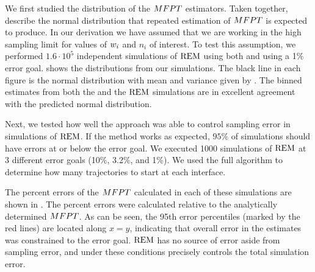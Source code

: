 We first studied the distribution of the $MFPT$ estimators. Taken together,  describe the normal distribution that repeated estimation of $MFPT$ is expected to produce. In our derivation we have assumed that we are working in the high sampling limit for values of $w_{i}$ and $n_i$ of interest. To test this assumption, we performed $1.6 \cdot 10^5$ independent simulations of $\text{REM}$ using both  and  using a 1\% error goal.  shows the distributions from our simulations. The black line in each figure is the normal distribution with mean and variance given by . The binned  estimates from both the  and the  $\text{REM}$ simulations are in excellent agreement with the predicted normal distribution.

Next, we tested how well the  approach was able to control sampling error in simulations of $\text{REM}$. If the method works as expected, $95\%$ of simulations should have errors at or below the  error goal. We executed 1000  simulations of $\text{REM}$ at 3 different error goals (10\%, 3.2\%, and 1\%). We used the full  algorithm to determine how many trajectories  to start at each interface.

The percent errors of the $MFPT$ calculated in each of these simulations are shown in . The percent errors were calculated relative to the analytically determined $MFPT$. As can be seen, the 95th error percentiles (marked by the red lines) are located along $x=y$, indicating that overall error in the  estimates was constrained to the error goal. $\text{REM}$ has no source of error aside from sampling error, and under these conditions  precisely controls the total simulation error.

